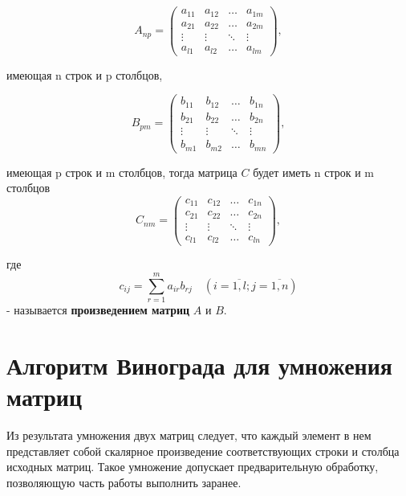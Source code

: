 \begin{equation}
    A_{np} = \begin{pmatrix}
            a_{11} & a_{12} & \ldots & a_{1m}\\
            a_{21} & a_{22} & \ldots & a_{2m}\\
            \vdots & \vdots & \ddots & \vdots\\
            a_{l1} & a_{l2} & \ldots & a_{lm}
    \end{pmatrix},
\end{equation}

имеющая n строк и p столбцов,

\begin{equation}
    B_{pm} = \begin{pmatrix}
            b_{11} & b_{12} & \ldots & b_{1n}\\
            b_{21} & b_{22} & \ldots & b_{2n}\\
            \vdots & \vdots & \ddots & \vdots\\
            b_{m1} & b_{m2} & \ldots & b_{mn}
        \end{pmatrix},
\end{equation}

имеющая p строк и m столбцов, тогда матрица $C$ будет иметь n строк и m столбцов
\begin{equation}
	C_{nm} = \begin{pmatrix}
		c_{11} & c_{12} & \ldots & c_{1n}\\
		c_{21} & c_{22} & \ldots & c_{2n}\\
		\vdots & \vdots & \ddots & \vdots\\
		c_{l1} & c_{l2} & \ldots & c_{ln}
	\end{pmatrix},
\end{equation}

где
\begin{equation}
	\label{eq:M}
	c_{ij} =
	\sum_{r=1}^{m} a_{ir}b_{rj} \quad (i=\overline{1,l}; j=\overline{1,n})
\end{equation}
- называется \textbf{произведением матриц} $A$ и $B$.

\clearpage

\section{Алгоритм Винограда для умножения матриц}
Из результата умножения двух матриц следует, что каждый элемент в нем представляет
собой скалярное произведение соответствующих строки и столбца исходных матриц.
Такое умножение допускает предварительную обработку,
позволяющую часть работы выполнить заранее.

